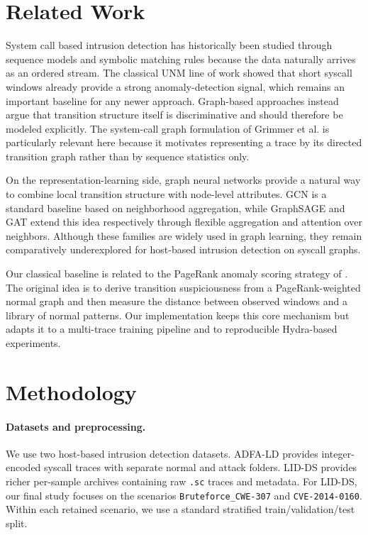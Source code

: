 \documentclass{article}
\begin{document}
\section{Related Work}
System call based intrusion detection has historically been studied through sequence models and symbolic matching rules because the data naturally arrives as an ordered stream. The classical UNM line of work \cite{unm_syscalls,alt_syscall_models} showed that short syscall windows already provide a strong anomaly-detection signal, which remains an important baseline for any newer approach. Graph-based approaches instead argue that transition structure itself is discriminative and should therefore be modeled explicitly. The system-call graph formulation of Grimmer et al. \cite{syscall_graphs} is particularly relevant here because it motivates representing a trace by its directed transition graph rather than by sequence statistics only.

On the representation-learning side, graph neural networks provide a natural way to combine local transition structure with node-level attributes. GCN \cite{gcn} is a standard baseline based on neighborhood aggregation, while GraphSAGE \cite{graphsage} and GAT \cite{gat} extend this idea respectively through flexible aggregation and attention over neighbors. Although these families are widely used in graph learning, they remain comparatively underexplored for host-based intrusion detection on syscall graphs.

Our classical baseline is related to the PageRank anomaly scoring strategy of \cite{pagerank_ids}. The original idea is to derive transition suspiciousness from a PageRank-weighted normal graph and then measure the distance between observed windows and a library of normal patterns. Our implementation keeps this core mechanism but adapts it to a multi-trace training pipeline and to reproducible Hydra-based experiments.


\section{Methodology}

\paragraph{Datasets and preprocessing.}
We use two host-based intrusion detection datasets. ADFA-LD \cite{adfa} provides integer-encoded syscall traces with separate normal and attack folders. LID-DS \cite{lid_ds} provides richer per-sample archives containing raw \texttt{.sc} traces and metadata. For LID-DS, our final study focuses on the scenarios \texttt{Bruteforce\_CWE-307} and \texttt{CVE-2014-0160}. Within each retained scenario, we use a standard stratified train/validation/test split.
\end{document}
